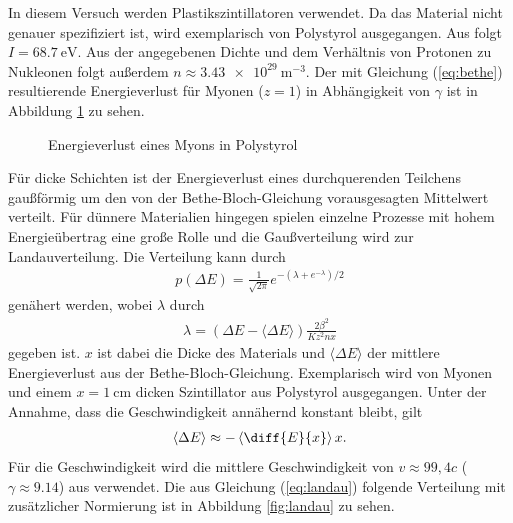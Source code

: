 In diesem Versuch werden Plastikszintillatoren verwendet. Da das Material nicht genauer spezifiziert ist, wird exemplarisch von Polystyrol ausgegangen. Aus \cite{polystyrene} folgt $I=\SI{68.7}{\electronvolt}$. Aus der angegebenen Dichte und dem Verhältnis von Protonen zu Nukleonen folgt außerdem $n\approx \SI{3.43e29}{\metre^{-3}}$. Der mit Gleichung (\ref{eq:bethe}) resultierende Energieverlust für Myonen ($z=1$) in Abhängigkeit von $\gamma$ ist in Abbildung \ref{fig:bethe} zu sehen.

\begin{figure}[h]
  \centering
  \caption{Energieverlust eines Myons in Polystyrol}
  \label{fig:bethe}
\end{figure}
Für dicke Schichten ist der Energieverlust eines durchquerenden Teilchens gaußförmig um den von der Bethe-Bloch-Gleichung vorausgesagten Mittelwert verteilt. Für dünnere Materialien hingegen spielen einzelne Prozesse mit hohem Energieübertrag eine große Rolle und die Gaußverteilung wird zur Landauverteilung. Die Verteilung kann durch
\begin{align}
  p(\Delta E)=\frac{1}{\sqrt{2\pi}}e^{-(\lambda+e^{-\lambda})/2}
  \label{eq:landau}
\end{align}
genähert werden, wobei $\lambda$ durch
\begin{align*}
  \lambda=(\Delta E-\langle \Delta E \rangle)\frac{2 \beta^2}{Kz^2nx}
\end{align*}
gegeben ist\cite{ketzer:vorlesung}. $x$ ist dabei die Dicke des Materials und $\langle \Delta E \rangle$ der mittlere Energieverlust aus der Bethe-Bloch-Gleichung. Exemplarisch wird von Myonen und einem $x=\SI{1}{\cm}$ dicken Szintillator aus Polystyrol ausgegangen. Unter der Annahme, dass die Geschwindigkeit annähernd konstant bleibt, gilt
\begin{align*}
  \langle \Delta E \rangle \approx -\left\langle  \diff{E}{x}  \right\rangle x. 
\end{align*}
Für die Geschwindigkeit wird die mittlere Geschwindigkeit von $v\approx 99,4 c$ ($\gamma \approx 9.14$) aus \cite{speed} verwendet. Die aus Gleichung (\ref{eq:landau}) folgende Verteilung mit zusätzlicher Normierung ist in Abbildung \ref{fig:landau} zu sehen.

